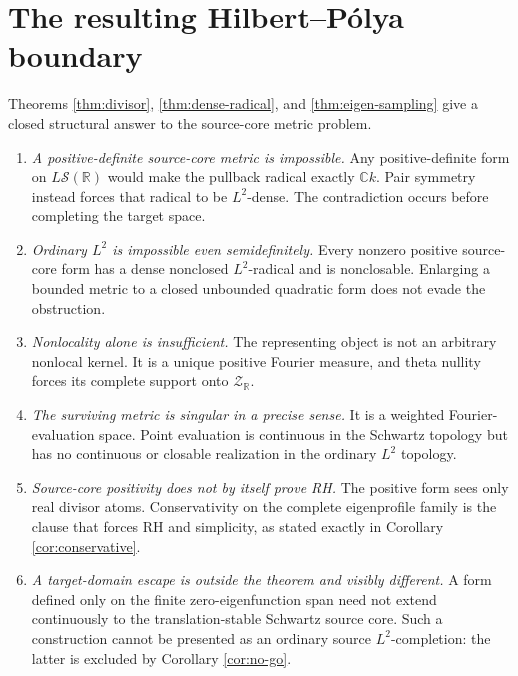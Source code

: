 \documentclass[11pt]{article}
\newcommand{\C}{\mathbb C}
\newcommand{\R}{\mathbb R}
\newcommand{\cS}{\mathcal S}
\newcommand{\cZ}{\mathcal Z}
\begin{document}
\section{The resulting Hilbert--Pólya boundary}\label{sec:boundary}

Theorems \ref{thm:divisor}, \ref{thm:dense-radical}, and
\ref{thm:eigen-sampling} give a closed structural answer to the source-core metric problem.

\begin{enumerate}[label=\textup{\arabic*.},leftmargin=2em]
\item \emph{A positive-definite source-core metric is impossible.}
Any positive-definite form on \(L\cS(\R)\) would make the pullback radical exactly
\(\C k\).  Pair symmetry instead forces that radical to be \(L^2\)-dense.  The contradiction
occurs before completing the target space.

\item \emph{Ordinary \(L^2\) is impossible even semidefinitely.}
Every nonzero positive source-core form has a dense nonclosed \(L^2\)-radical and is
nonclosable.  Enlarging a bounded metric to a closed unbounded quadratic form does not evade the
obstruction.

\item \emph{Nonlocality alone is insufficient.}
The representing object is not an arbitrary nonlocal kernel.  It is a unique positive
Fourier measure, and theta nullity forces its complete support onto \(\cZ_{\R}\).

\item \emph{The surviving metric is singular in a precise sense.}
It is a weighted Fourier-evaluation space.  Point evaluation is continuous in the Schwartz
topology but has no continuous or closable realization in the ordinary \(L^2\) topology.

\item \emph{Source-core positivity does not by itself prove RH.}
The positive form sees only real divisor atoms.  Conservativity on the complete eigenprofile
family is the clause that forces RH and simplicity, as stated exactly in
Corollary \ref{cor:conservative}.

\item \emph{A target-domain escape is outside the theorem and visibly different.}
A form defined only on the finite zero-eigenfunction span need not extend continuously to the
translation-stable Schwartz source core.  Such a construction cannot be presented as an ordinary
source \(L^2\)-completion: the latter is excluded by Corollary \ref{cor:no-go}.
\end{enumerate}
\end{document}
